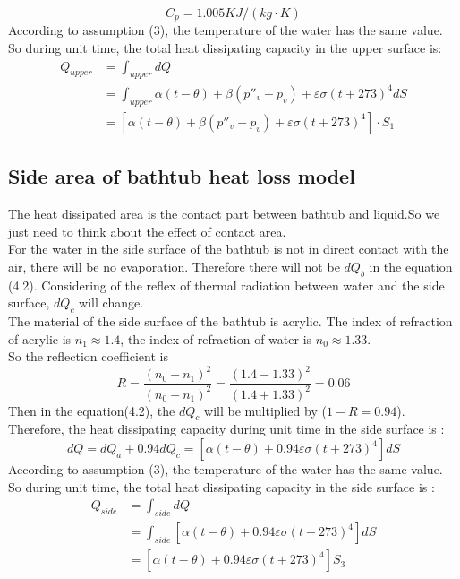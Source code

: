\documentclass{mcmthesis}
\begin{document}
\begin{equation}
C_{p}=1.005KJ/(kg\cdot K)
\end{equation}
\indent According to assumption (3), the temperature of the water has the same value. So during unit time, the total heat dissipating capacity in the upper surface is:\\
\begin{equation}
\begin{split}
Q_{upper}&=\int_{upper} dQ\\
&= \int_{upper}\alpha (t-\theta)+\beta ({p}''_{v}-p_{v})+\varepsilon \sigma (t+273)^{4}dS	\\
&=[\alpha (t-\theta)+\beta ({p}''_{v}-p_{v})+\varepsilon \sigma (t+273)^{4}]\cdot S_{1}\
\end{split}
\end{equation}

\subsection{Side area of bathtub heat loss model} 	%
\indent The heat dissipated area is the contact part between bathtub and liquid.So we just need to think about the effect of contact area. \\ \indent For the water in the side surface of the bathtub is not in direct contact with the air, there will be no evaporation. Therefore there will not be $ dQ_{b} $ in the equation (4.2). Considering of the reflex of thermal radiation between water and the side surface, $dQ_{c}$ will change.\\ \indent The material of the side surface of the bathtub is acrylic. The index of refraction of acrylic is $n_{1}\approx 1.4$, the index of refraction of water is $ n_{0}\approx 1.33 $.\\ \indent So the reflection coefficient is 
\begin{equation}
	 R=\frac{(n_{0}-n_{1})^{2}}{(n_{0}+n_{1})^{2}}=\frac{(1.4-1.33)^{2}}{(1.4+1.33)^2}=0.06 
\end{equation}
\indent Then in the equation(4.2),  the $dQ_{c}$ will be multiplied by ($1-R=0.94$).  Therefore, the heat dissipating capacity during unit time in the side surface is :
\begin{equation}
	dQ=dQ_{a}+0.94dQ_{c}=[\alpha (t-\theta)+0.94\varepsilon \sigma (t+273)^{4}]dS
\end{equation}
\indent According to assumption (3), the temperature of the water has the same value. So during unit time, the total heat dissipating capacity in the side surface is :				%
\begin{equation}
\begin{split}
Q_{side}&=\int_{side}dQ\\
&= \int_{side} [\alpha (t-\theta)+0.94\varepsilon \sigma (t+273)^{4}]dS	\\
&=[\alpha (t-\theta)+0.94\varepsilon \sigma (t+273)^{4}]S_{3}\\
\end{split}
\end{equation}
\end{document}
